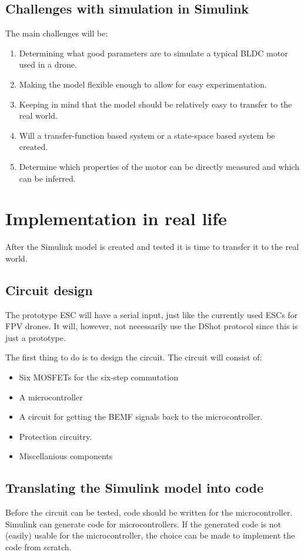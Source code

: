 \documentclass[]{report}
\begin{document}
\subsection{Challenges with simulation in Simulink}
The main challenges will be:
\begin{enumerate}
	\item Determining what good parameters are to simulate a typical BLDC motor used in a drone.
	\item Making the model flexible enough to allow for easy experimentation.
	\item Keeping in mind that the model should be relatively easy to transfer to the real world.
	\item Will a transfer-function based system or a state-space based system be created.
	\item Determine which properties of the motor can be directly measured and which can be inferred.
\end{enumerate}

\section{Implementation in real life}
After the Simulink model is created and tested it is time to transfer it to the real world.

\subsection{Circuit design}
The prototype ESC will have a serial input, just like the currently used ESCs for FPV drones. It will, however, not necessarily use the DShot protocol since this is just a prototype.

The first thing to do is to design the circuit. The circuit will consist of:
\begin{itemize}
	\item Six MOSFETs for the six-step commutation
	\item A microcontroller
	\item A circuit for getting the BEMF signals back to the microcontroller.
	\item Protection circuitry.
	\item Miscellanious components
\end{itemize}

\subsection{Translating the Simulink model into code}
Before the circuit can be tested, code should be written for the microcontroller. Simulink can generate code for microcontrollers. If the generated code is not (easily) usable for the microcontroller, the choice can be made to implement the code from scratch.
\end{document}
